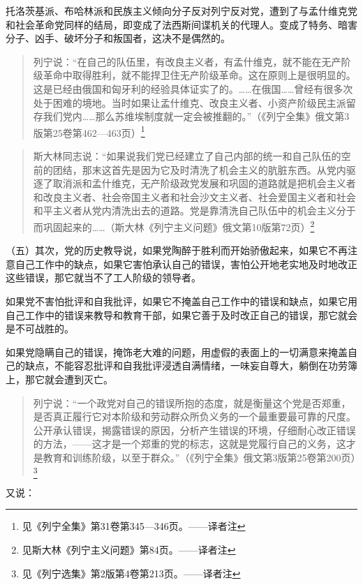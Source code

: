 托洛茨基派、布哈林派和民族主义倾向分子反对列宁反对党，遭到了与孟什维克党和社会革命党同样的结局，即变成了法西斯间谍机关的代理人。变成了特务、暗害分子、凶手、破坏分子和叛国者，这决不是偶然的。

\begin{quotation}
列宁说：“在自己的队伍里，有改良主义者，有孟什维克，就不能在无产阶级革命中取得胜利，就不能捍卫住无产阶级革命。这在原则上是很明显的。这是已经由俄国和匈牙利的经验具体证实了的。……在俄国……曾经有很多次处于困难的境地。当时如果让孟什维克、改良主义者、小资产阶级民主派留存我们党内……那么苏维埃制度就一定会被推翻的。”（《列宁全集》俄文第3版第25卷第462—463页）\footnote{见《列宁全集》第31卷第345—346页。——译者注}
\end{quotation}

\begin{quotation}
斯大林同志说：“如果说我们党已经建立了自己内部的统一和自己队伍的空前的团结，那末这首先是因为它及时清洗了机会主义的肮脏东西。从党内驱逐了取消派和孟什维克，无产阶级政党发展和巩固的道路就是把机会主义者和改良主义者、社会帝国主义者和社会沙文主义者、社会爱国主义者和社会和平主义者从党内清洗出去的道路。党是靠清洗自己队伍中的机会主义分于而巩固起来的……（斯大林《列宁主义问题》俄文第10版第72页）\footnote{见斯大林《列宁主义问题》第84页。——译者注}
\end{quotation}

（五）其次，党的历史教导说，如果党陶醉于胜利而开始骄傲起来，如果它不再注意自己工作中的缺点，如果它害怕承认自己的错误，害怕公开地老实地及时地改正这些错误，那它就当不了工人阶级的领导者。

如果党不害怕批评和自我批评，如果它不掩盖自己工作中的错误和缺点，如果它用自己工作中的错误来教导和教育干部，如果它善于及时改正自己的错误，那它就会是不可战胜的。

如果党隐瞒自己的错误，掩饰老大难的问题，用虚假的表面上的一切满意来掩盖自己的缺点，不能容忍批评和自我批评浸透自满情绪，一味妄自尊大，躺倒在功劳簿上，那它就会遭到灭亡。

\begin{quotation}
列宁说：“一个政党对自己的错误所抱的态度，就是衡量这个党是否郑重，是否真正履行它对本阶级和劳动群众所负义务的一个最重要最可靠的尺度。公开承认错误，揭露错误的原因，分析产生错误的环境，仔细耐心改正错误的方法，——这才是一个郑重的党的标志，这就是党履行自己的义务，这才是教育和训练阶级，以至于群众。”（《列宁全集》俄文第3版第25卷第200页）\footnote{见《列宁选集》第2版第4卷第213页。——译者注}
\end{quotation}

又说：

